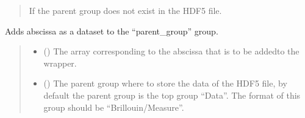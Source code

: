\documentclass[letterpaper,10pt,english]{sphinxmanual}
\begin{document}
\begin{fulllineitems}
\begin{fulllineitems}
\begin{quote}
\begin{description}
\begin{itemize}
\end{itemize}

\sphinxAtStartPar
{\hyperref[\detokenize{source/_autosummary/HDF5_BLS.errors:HDF5_BLS.errors.WrapperError_StructureError}]{}} \textendash{} If the parent group does not exist in the HDF5 file.

\end{description}\end{quote}

\end{fulllineitems}


\begin{fulllineitems}
\label{\detokenize{source/_autosummary/HDF5_BLS.Wrapper:HDF5_BLS.Wrapper.add_abscissa}}
\pysigstartsignatures
\pysiglinewithargsret
{}
{\sphinxparamcomma {}\sphinxparamcomma {}\sphinxparamcomma {}\sphinxparamcomma {}\sphinxparamcomma {}\sphinxparamcomma {}}
{}
\pysigstopsignatures
\sphinxAtStartPar
Adds abscissa as a dataset to the “parent\_group” group.
\begin{quote}\begin{description}
\begin{itemize}
\item {} 
\sphinxAtStartPar
{} () \textendash{} The array corresponding to the abscissa that is to be addedto the wrapper.

\item {} 
\sphinxAtStartPar
{} (\sphinxstyleliteralemphasis{\sphinxupquote{, }}) \textendash{} The parent group where to store the data of the HDF5 file, by default the parent group is the top group “Data”. The format of this group should be “Brillouin/Measure”.


\end{itemize}
\end{description}
\end{quote}
\end{fulllineitems}
\end{fulllineitems}
\end{document}
